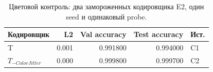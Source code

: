 \begin{table}[H]\centering\small
\setlength{\tabcolsep}{4pt}
\caption{Цветовой контроль: два замороженных кодировщика E2, один seed и одинаковый probe.}\label{tab:hue_control}
\begin{tabular}{lrrrl}
\toprule
Кодировщик & L2 & Val accuracy & Test accuracy & Ист. \\
\midrule
T & 0.001 & 0.991800 & 0.994000 & C1 \\
$T_{-ColorJitter}$ & 0.000 & 0.999800 & 0.999700 & C2 \\
\bottomrule
\end{tabular}
\end{table}
